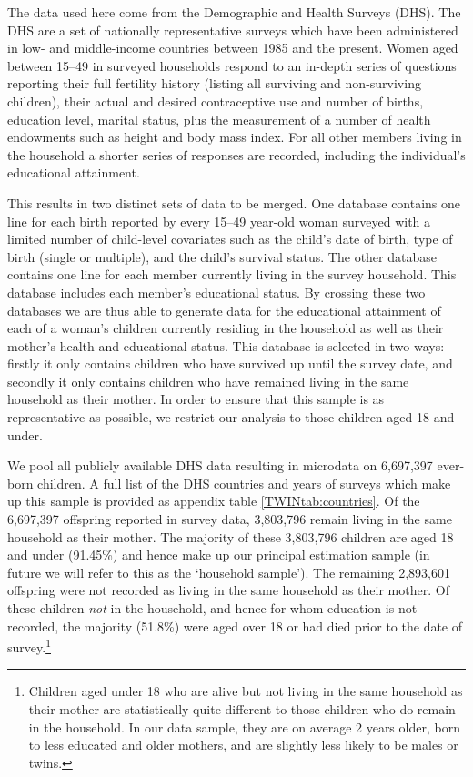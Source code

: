 The data used here come from the Demographic and Health Surveys (DHS).  The DHS 
are a set of nationally representative surveys which have been administered in 
low- and middle-income countries between 1985 and the present.  Women aged 
between 15--49 in surveyed households respond to an in-depth series of questions 
reporting their full fertility history (listing all surviving and non-surviving 
children), their actual and desired contraceptive use and number of births, 
education level, marital status, plus the measurement of a number of health 
endowments such as height and body mass index.  For all other members living in 
the household a shorter series of responses are recorded, including the 
individual's educational attainment.

This results in two distinct sets of data to be merged.  One database contains
one line for each birth reported by every 15--49 year-old woman surveyed with
a limited number of child-level covariates such as the child's date of birth,
type of birth (single or multiple), and the child's survival status.  The other
database contains one line for each member currently living in the survey 
household.  This database includes each member's educational status.  By 
crossing these two databases we are thus able to generate data for the
educational attainment of each of a woman's children currently residing in the 
household as well as their mother's health and educational status.  This 
database is selected in two ways: firstly it only contains children who have 
survived up until the survey date, and secondly it only contains children who 
have remained living in the same household as their mother.  In order to ensure 
that this sample is as representative as possible, we restrict our analysis to 
those children aged 18 and under.

We pool all publicly available DHS data resulting in microdata on 6,697,397 
ever-born children.  A full list of the DHS countries and years of surveys which
make up this sample is provided as appendix table \ref{TWINtab:countries}.  Of 
the 6,697,397 offspring reported in survey data, 3,803,796 remain living in the 
same household as their mother.  The majority of these 3,803,796 children are 
aged 18 and under (91.45\%) and hence make up our principal estimation sample (in 
future we will refer to this as the `household sample').  The remaining 2,893,601 
offspring were not recorded as living in the same household as their mother.  Of 
these children \emph{not} in the household, and hence for whom education is not 
recorded, the majority (51.8\%) were aged over 18 or had died prior to the date 
of survey.\footnote{Children aged under 18 who are alive but not living in the 
same household as their mother are statistically quite different to those 
children who do remain in the household.  In our data sample, they are on average 
2 years older, born to less educated and older mothers, and are slightly less 
likely to be males or twins.}

